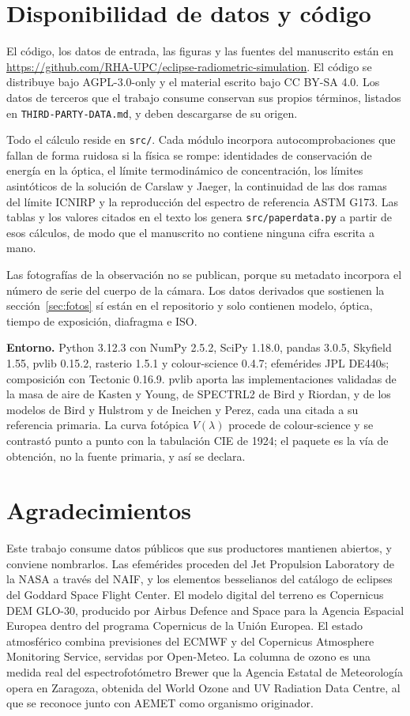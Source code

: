 \documentclass[10pt,a4paper]{article}
\newcommand{\repourl}{https://github.com/RHA-UPC/eclipse-radiometric-simulation}
\begin{document}
\section*{Disponibilidad de datos y código}

El código, los datos de entrada, las figuras y las fuentes del manuscrito están
en \url{\repourl}. El código se distribuye bajo AGPL-3.0-only y el material
escrito bajo CC BY-SA 4.0. Los datos de terceros que el trabajo consume
conservan sus propios términos, listados en \texttt{THIRD-PARTY-DATA.md}, y
deben descargarse de su origen.

Todo el cálculo reside en \texttt{src/}. Cada módulo incorpora
autocomprobaciones que fallan de forma ruidosa si la física se rompe:
identidades de conservación de energía en la óptica, el límite termodinámico de
concentración, los límites asintóticos de la solución de Carslaw y Jaeger, la
continuidad de las dos ramas del límite ICNIRP y la reproducción del espectro de
referencia ASTM G173. Las tablas y los valores citados en el texto los genera
\texttt{src/paperdata.py} a partir de esos cálculos, de modo que el manuscrito
no contiene ninguna cifra escrita a mano.

Las fotografías de la observación no se publican, porque su metadato incorpora
el número de serie del cuerpo de la cámara. Los datos derivados que sostienen la
sección~\ref{sec:fotos} sí están en el repositorio y solo contienen modelo,
óptica, tiempo de exposición, diafragma e ISO.

\textbf{Entorno.} Python 3.12.3 con NumPy 2.5.2, SciPy 1.18.0, pandas 3.0.5,
Skyfield 1.55, pvlib 0.15.2, rasterio 1.5.1 y colour-science 0.4.7; efemérides
JPL DE440s; composición con Tectonic 0.16.9. pvlib aporta las implementaciones
validadas de la masa de aire de Kasten y Young, de SPECTRL2 de Bird y Riordan, y
de los modelos de Bird y Hulstrom y de Ineichen y Perez, cada una citada a su
referencia primaria. La curva fotópica $V(\lambda)$ procede de colour-science y
se contrastó punto a punto con la tabulación CIE de 1924; el paquete es la vía de
obtención, no la fuente primaria, y así se declara.

\section*{Agradecimientos}

Este trabajo consume datos públicos que sus productores mantienen abiertos, y
conviene nombrarlos. Las efemérides proceden del Jet Propulsion Laboratory de la
NASA a través del NAIF, y los elementos besselianos del catálogo de eclipses del
Goddard Space Flight Center. El modelo digital del terreno es Copernicus DEM
GLO-30, producido por Airbus Defence and Space para la Agencia Espacial Europea
dentro del programa Copernicus de la Unión Europea. El estado atmosférico
combina previsiones del ECMWF y del Copernicus Atmosphere Monitoring Service,
servidas por Open-Meteo. La columna de ozono es una medida real del
espectrofotómetro Brewer que la Agencia Estatal de Meteorología opera en
Zaragoza, obtenida del World Ozone and UV Radiation Data Centre, al que se
reconoce junto con AEMET como organismo originador.
\end{document}
